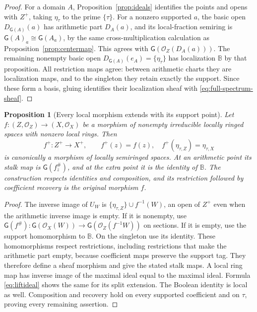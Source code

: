 \documentclass[11pt,a4paper]{article}
\newtheorem{proposition}[theorem]{Proposition}
\theoremstyle{definition}\newtheorem{definition}[theorem]{Definition}
\newcommand{\G}{\mathsf G}\newcommand{\Tor}{\operatorname{Tor}}\newcommand{\Frac}{\operatorname{Frac}}
\begin{document}
\begin{proof}
For a domain $A$, Proposition~\ref{prop:ideals} identifies the points
and opens with $Z^+$, taking $\eta_\tau$ to the prime $\{\tau\}$.
For a nonzero supported $a$, the basic open $D_{\G(A)}(a)$ has
arithmetic part $D_A(a)$, and its local-fraction semiring is
$\G(A)_a\cong\G(A_a)$, by the same cross-multiplication calculation
as Proposition~\ref{prop:centermap}. This agrees with
$\G(\mathcal O_Z(D_A(a)))$. The remaining nonempty basic open
$D_{\G(A)}(e_A)=\{\eta_\tau\}$ has localization $\mathbb B$ by that
proposition. All restriction maps agree: between arithmetic charts
they are localization maps, and to the singleton they retain exactly
the support. Since these form a basis, gluing identifies their
localization sheaf with \eqref{eq:full-spectrum-sheaf}.
\end{proof}

\begin{proposition}[Every local morphism extends with its support point]
\label{prop:fullspectralfunctor}
Let $f:(Z,\mathcal O_Z)\to(X,\mathcal O_X)$ be a morphism of nonempty
irreducible locally ringed spaces with nonzero local rings. Then
\[
 f^+:Z^+\longrightarrow X^+,\qquad
 f^+(z)=f(z),\quad f^+(\eta_{\tau,Z})=\eta_{\tau,X}
 \tag{AV6.7}\label{eq:full-morphism}
\]
is canonically a morphism of locally semiringed spaces. At an arithmetic
point its stalk map is $\G(f_z^\#)$, and at the extra point it is the
identity of $\mathbb B$. The construction respects identities and
composition, and its restriction followed by coefficient recovery
is the original morphism $f$.
\end{proposition}
\begin{proof}
The inverse image of $U_W$ is
$\{\eta_{\tau,Z}\}\cup f^{-1}(W)$, an open of $Z^+$ even when the
arithmetic inverse image is empty. If it is nonempty, use
$\G(f^\#):\G(\mathcal O_X(W))\to
\G(\mathcal O_Z(f^{-1}W))$ on sections. If it is empty, use the support
homomorphism to $\mathbb B$. On the singleton use its identity.
These homomorphisms respect restrictions, including restrictions that
make the arithmetic part empty, because coefficient maps preserve the
support tag. They therefore define a sheaf morphism and give the stated
stalk maps. A local ring map has inverse image of the maximal ideal
equal to the maximal ideal. Formula \eqref{eq:liftideal} shows the same
for its split extension. The Boolean identity is local as well.
Composition and recovery hold on every supported coefficient and on
$\tau$, proving every remaining assertion.
\end{proof}
\end{document}

